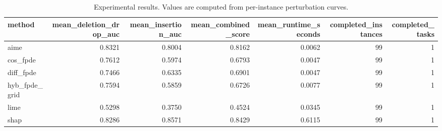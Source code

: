 \begin{table}[t]
\caption{Experimental results. Values are computed from per-instance perturbation curves.}
\label{tab:main_results_computed}
\centering
\begin{tabular}{lrrrrrr}
\toprule
method & mean\_deletion\_drop\_auc & mean\_insertion\_auc & mean\_combined\_score & mean\_runtime\_seconds & completed\_instances & completed\_tasks \\
\midrule
aime & 0.8321 & 0.8004 & 0.8162 & 0.0062 & 99 & 1 \\
cos\_fpde & 0.7612 & 0.5974 & 0.6793 & 0.0047 & 99 & 1 \\
diff\_fpde & 0.7466 & 0.6335 & 0.6901 & 0.0047 & 99 & 1 \\
hyb\_fpde\_grid & 0.7594 & 0.5859 & 0.6726 & 0.0077 & 99 & 1 \\
lime & 0.5298 & 0.3750 & 0.4524 & 0.0345 & 99 & 1 \\
shap & 0.8286 & 0.8571 & 0.8429 & 0.6115 & 99 & 1 \\
\bottomrule
\end{tabular}

\end{table}
